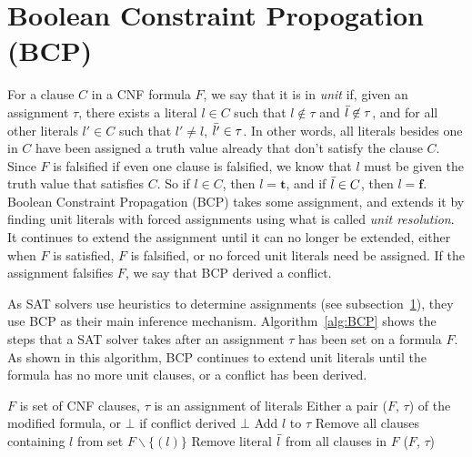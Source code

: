 \section{Boolean Constraint Propogation (BCP)} \label{subsec:BCP}
For a clause $C$ in a CNF formula $F$, we say that it is in \textit{unit} if, given an assignment $\tau$, there exists a literal $l \in C$ such that $l \not\in \tau$ and $\Bar{l} \not\in \tau$, and for all other literals $l' \in C$ such that $l' \ne l$, $\Bar{l'} \in \tau$. In other words, all literals besides one in $C$ have been assigned a truth value already that don't satisfy the clause $C$. Since $F$ is falsified if even one clause is falsified, we know that $l$ must be given the truth value that satisfies $C$. So if $l \in C$, then $l = \boldsymbol t$, and if $\Bar{l} \in C$, then $l = \boldsymbol f$. 
Boolean Constraint Propagation (BCP) takes some assignment, and extends it by finding unit literals with forced assignments using what is called \textit{unit resolution}. It continues to extend the assignment until it can no longer be extended, either when $F$ is satisfied, $F$ is falsified, or no forced unit literals need be assigned. If the assignment falsifies $F$, we say that BCP derived a conflict. \par
As SAT solvers use heuristics to determine assignments (see subsection~\ref{subsec:BCP}), they use BCP as their main inference mechanism. Algorithm~\ref{alg:BCP} shows the steps that a SAT solver takes after an assignment $\tau$ has been set on a formula $F$. As shown in this algorithm, BCP continues to extend unit literals until the formula has no more unit clauses, or a conflict has been derived. 
\begin{algorithm}
\caption{$BCP(F, \tau)$}
\label{alg:BCP}
\begin{algorithmic}[1]
    \Require $F$ is set of CNF clauses, $\tau$ is an assignment of literals
    \Ensure Either a pair ($F$, $\tau$) of the modified formula, or $\bot$ if conflict derived
            \Return $\bot$ 
        \EndIf
        \State Add $l$ to $\tau$
        \State Remove all clauses containing $l$ from set $F \backslash \{(l)\}$
        \State Remove literal $\Bar{l}$ from all clauses in $F$
    \EndWhile
    \State \Return ($F$, $\tau$)
\end{algorithmic}
\end{algorithm}

